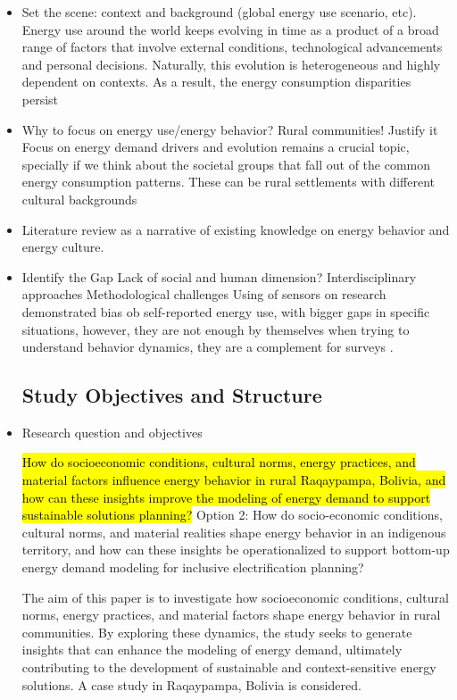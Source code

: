 \documentclass[final,3p,times,onecolumn]{elsarticle}
\begin{document}
\begin{itemize}
    \item Set the scene: context and background (global energy use scenario, etc).
    Energy use around the world keeps evolving in time as a product of a broad range of factors that involve external conditions, technological advancements and personal decisions. Naturally, this evolution is heterogeneous and highly dependent on contexts. As a result, the energy consumption disparities persist
    \item Why to focus on energy use/energy behavior? Rural communities! Justify it
    Focus on energy demand drivers and evolution remains a crucial topic, specially if we think about the societal groups that fall out of the common energy consumption patterns. These can be rural settlements with different cultural backgrounds
    \item Literature review as a narrative of existing knowledge on energy behavior and energy culture.
    \item Identify the Gap
    Lack of social and human dimension?
    Interdisciplinary approaches
    Methodological challenges
    Using of sensors on research demonstrated bias ob self-reported energy use, with bigger gaps in specific situations, however, they are not enough by themselves when trying to understand behavior dynamics, they are a complement for surveys \cite{rom_using_2020}.
\subsection{Study Objectives and Structure}
\label{sec:objectives}

    \item Research question and objectives
    
    \hl{How do socioeconomic conditions, cultural norms, energy practices, and material factors influence energy behavior in rural Raqaypampa, Bolivia, and how can these insights improve the modeling of energy demand to support sustainable solutions planning?}
    Option 2: How do socio-economic conditions, cultural norms, and material realities shape energy behavior in an indigenous territory, and how can these insights be operationalized to support bottom-up energy demand modeling for inclusive electrification planning?
    
    The aim of this paper is to investigate how socioeconomic conditions, cultural norms, energy practices, and material factors shape energy behavior in rural communities. By exploring these dynamics, the study seeks to generate insights that can enhance the modeling of energy demand, ultimately contributing to the development of sustainable and context-sensitive energy solutions. A case study in Raqaypampa, Bolivia is considered.
    

\end{itemize}
\end{document}
